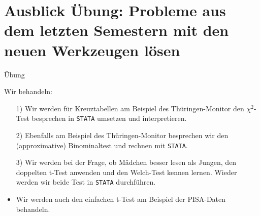 \documentclass[usenames,dvipsnames,handout]{beamer}
\begin{document}
\section{Ausblick Übung: Probleme aus dem letzten Semestern mit den neuen Werkzeugen lösen}%

\begin{frame}{Übung}

Wir behandeln:
\begin{itemize}
\item[1)]{Wir werden für  Kreuztabellen am Beispiel des Thüringen-Monitor den $\chi^{2}$-Test besprechen in 
\texttt{STATA} umsetzen und  interpretieren.}
\item[2)]{Ebenfalls am Beispiel des Thüringen-Monitor besprechen wir den (approximative) Binominaltest
und rechnen mit \texttt{STATA}.} %
\item[3)]{Wir werden bei der Frage, ob Mädchen besser lesen als Jungen, den doppelten t-Test anwenden
und den Welch-Test kennen lernen. Wieder werden wir beide Test in \texttt{STATA} durchführen.}
\item{Wir werden auch den einfachen t-Test am Beispiel der PISA-Daten behandeln.} %
\end{itemize}
\end{frame}

\end{document}
